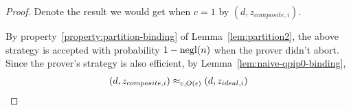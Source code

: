\begin{proof}



Denote the result we would get when $c=1$ by $(d,z_{composite,i})$.

By  property~\ref{property:partition-binding} of Lemma~\ref{lem:partition2}, the above strategy is accepted with probability $1-\operatorname{negl}(n)$ when the prover didn't abort. Since the prover's strategy is also efficient, by Lemma~\ref{lem:naive-qpip0-binding},
\begin{align}
	(d,z_{composite,i})\approx_{c, O(\epsilon)}(d,z_{ideal,i})
\end{align}





\end{proof}
